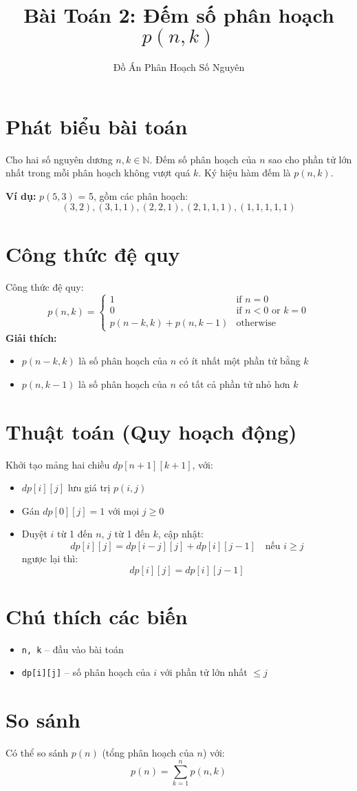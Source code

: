 \documentclass[12pt]{article}
\title{Bài Toán 2: Đếm số phân hoạch $p(n,k)$}
\author{Đồ Án Phân Hoạch Số Nguyên}
\date{}
\begin{document}
\maketitle

\section*{Phát biểu bài toán}
Cho hai số nguyên dương $n, k \in \mathbb{N}$. Đếm số phân hoạch của $n$ sao cho phần tử lớn nhất trong mỗi phân hoạch không vượt quá $k$. Ký hiệu hàm đếm là $p(n, k)$.

\textbf{Ví dụ:} $p(5,3)$ = 5, gồm các phân hoạch:
\[
(3,2), (3,1,1), (2,2,1), (2,1,1,1), (1,1,1,1,1)
\]

\section*{Công thức đệ quy}
Công thức đệ quy:
\[
p(n,k) = 
\begin{cases}
1 & \text{if } n = 0 \\
0 & \text{if } n < 0 \text{ or } k = 0 \\
p(n-k,k) + p(n,k-1) & \text{otherwise}
\end{cases}
\]
\textbf{Giải thích:}
\begin{itemize}
    \item $p(n-k, k)$ là số phân hoạch của $n$ có ít nhất một phần tử bằng $k$
    \item $p(n, k-1)$ là số phân hoạch của $n$ có tất cả phần tử nhỏ hơn $k$
\end{itemize}

\section*{Thuật toán (Quy hoạch động)}
Khởi tạo mảng hai chiều $dp[n+1][k+1]$, với:
\begin{itemize}
    \item $dp[i][j]$ lưu giá trị $p(i, j)$
    \item Gán $dp[0][j] = 1$ với mọi $j \geq 0$
    \item Duyệt $i$ từ 1 đến $n$, $j$ từ 1 đến $k$, cập nhật:
    \[
    dp[i][j] = dp[i-j][j] + dp[i][j-1] \quad \text{nếu } i \geq j
    \]
    ngược lại thì:
    \[
    dp[i][j] = dp[i][j-1]
    \]
\end{itemize}

\section*{Chú thích các biến}
\begin{itemize}[itemsep=0pt]
    \item \texttt{n, k} – đầu vào bài toán
    \item \texttt{dp[i][j]} – số phân hoạch của $i$ với phần tử lớn nhất $\leq j$
\end{itemize}

\section*{So sánh}
Có thể so sánh $p(n)$ (tổng phân hoạch của $n$) với:
\[
p(n) = \sum_{k=1}^{n} p(n,k)
\]
\end{document}
